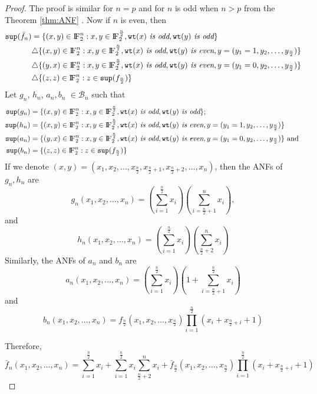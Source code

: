 \documentclass{article}[12pt]
\newcommand{\FF}{{\rm I\!F}}
\newcommand{\CB}{\mathcal{B}}
\newcommand{\wt}{\mathtt{wt}}
\newcommand{\spt}{\mathtt{sup}}
\begin{document}
\begin{proof}
	The proof is similar for $n = p$ and for $n$ is odd when $n > p$ from the Theorem \ref{thm:ANF} . Now if $n$ is even, then 
	\begin{align*}
		\spt(\bar{f}_n)& = \{(x,y) \in \FF_2^n : x,y \in \FF_2^{\frac{n}{2}}, \wt(x) \textit{ is odd}, \wt(y) \textit{ is odd}\}\\
		& \triangle \{(x,y) \in \FF_2^n : x,y \in \FF_2^{\frac{n}{2}}, \wt(x) \textit{ is odd}, \wt(y) \textit{ is even}, y=(y_1 = 1, y_2, \ldots,y_{\frac{n}{2}}) \}\\
		& \triangle \{(y,x)\in \FF_2^n : x,y \in \FF_2^{\frac{n}{2}}, \wt(x) \textit{ is odd}, \wt(y) \textit{ is even}, y=(y_1 = 0, y_2, \ldots,y_{\frac{n}{2}}) \} \\
		& \triangle \{(z,z) \in \FF_2^n : z \in \spt(f_{\frac{n}{2}})\}
	\end{align*} 
	Let $g_n$, $h_n$, $a_n, b_n$ $ \in \CB_n$ such that
	\begin{align*}
		\spt(g_n)& =\{(x,y) \in \FF_2^n : x,y \in \FF_2^{\frac{n}{2}}, \wt(x) \textit{ is odd}, \wt(y) \textit{ is odd}\} ; \\
		\spt(h_n) & = \{(x,y) \in \FF_2^n : x,y \in \FF_2^{\frac{n}{2}}, \wt(x) \textit{ is odd}, \wt(y) \textit{ is even}, y=(y_1 = 1, y_2, \ldots,y_{\frac{n}{2}}) \} \\
		\spt(a_n)& = \{(y,x)\in \FF_2^n : x,y \in \FF_2^{\frac{n}{2}}, \wt(x) \textit{ is odd}, \wt(y) \textit{ is even}, y=(y_1 = 0, y_2, \ldots,y_{\frac{n}{2}}) \} \text{ and } \\
		\spt(b_n)& = \{(z,z) \in \FF_2^n : z \in \spt(f_{\frac{n}{2}})\}
	\end{align*}
If we denote $(x,y)= (x_1,x_2,\ldots,x_\frac{n}{2},x_{\frac{n}{2}+1},x_{\frac{n}{2}+2}, \ldots, x_n)$, then  the ANFs of $g_n, h_n$ are
	         $$ g_n(x_1,x_2,\ldots,x_n)= (\sum_{i=1}^{\frac{n}{2}} x_i)(\sum_{i=\frac{n}{2}+1}^{n}x_i),$$
	         and 
	         $$ h_n(x_1,x_2,\ldots,x_n)= (\sum_{i=1}^{\frac{n}{2}} x_i)(\sum_{\frac{n}{2}+2}^{n}x_i) $$
Similarly, the ANFs of $a_n$ and $b_n$ are 
             $$ a_n(x_1,x_2,\ldots,x_n)= (\sum_{i=1}^{\frac{n}{2}} x_i)(1+ \sum_{i=\frac{n}{2}+1}^{\frac{n}{2}}x_i)$$
             and
             $$ b_n(x_1,x_2,\ldots,x_n)= f_{\frac{n}{2}}(x_1,x_2, \ldots, x_{\frac{n}{2}}) \prod_{i=1}^{\frac{n}{2}}(x_i+x_{\frac{n}{2}+i}+1)$$
	         
Therefore, 
$$\bar{f}_n(x_1,x_2,\ldots,x_n)=  \sum_{i=1}^{\frac{n}{2}} x_i + \sum_{i=1}^{\frac{n}{2}} x_i  \sum_{\frac{n}{2}+2}^{n}x_i +	\bar{f}_{\frac{n}{2}}(x_1,x_2, \ldots, x_{\frac{n}{2}}) \prod_{i=1}^{\frac{n}{2}}(x_i+x_{\frac{n}{2}+i}+1)$$
\end{proof}
\end{document}
